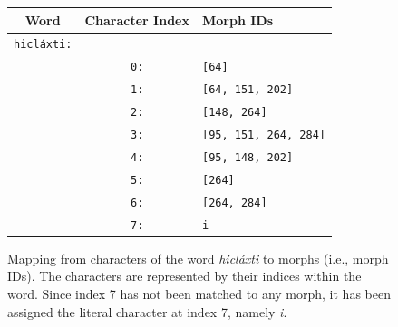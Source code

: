 \begin{figure}[t]
\centering
\setlength{\extrarowheight}{6pt}
\begin{tabular}{ccl}
\toprule
Word & Character Index & Morph IDs\\
\midrule
\texttt{hicl\'{a}xti:} & &\\
&  \texttt{0:} & \texttt{[64]} \\
& \texttt{1:} & \texttt{[64, 151, 202]} \\
& \texttt{2:} & \texttt{[148, 264]} \\
& \texttt{3:} & \texttt{[95, 151, 264, 284]} \\
& \texttt{4:} & \texttt{[95, 148, 202]} \\
& \texttt{5:} & \texttt{[264]} \\
& \texttt{6:} & \texttt{[264, 284]} \\
& \texttt{7:} & \texttt{i} \\
\bottomrule
\end{tabular}
\label{fig:chars-to-morphs-tab}
\caption{Mapping from characters of the word \textit{hicl\'{a}xti} to morphs (i.e., morph IDs). The characters are represented by their indices within the word. Since index 7 has not been matched to any morph, it has been assigned the literal character at index 7, namely \textit{i}.} %
\end{figure}
